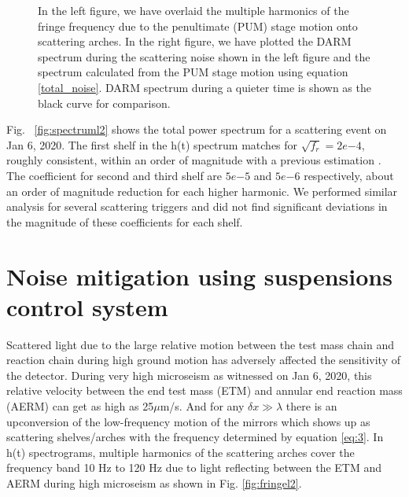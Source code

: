\documentclass[12pt]{iopart}
\begin{document}
\begin{figure}[h]
\begin{subfigure}[b]{0.45\textwidth}
    
    \end{subfigure}
    \caption{In the left figure, we have overlaid the multiple harmonics of the fringe frequency due to the penultimate (PUM) stage motion onto scattering arches. In the right figure, we have plotted the DARM spectrum during the scattering noise shown in the left figure and the spectrum calculated from the PUM stage motion using equation \ref{total_noise}. DARM spectrum during a quieter time is shown as the black curve for comparison.}
    \label{fig:fringespectrum}
    
\end{figure}


Fig. ~\ref{fig:spectruml2} shows the total power spectrum for a scattering event on Jan 6, 2020. The first shelf in the h(t) spectrum matches for $\sqrt{f_{r}} = 2e{-4}$, roughly consistent, within an order of magnitude with a previous estimation \cite{hiro_calc}. The coefficient for second and third shelf are $5e{-5}$ and $5e{-6}$ respectively, about an order of magnitude reduction for each higher harmonic. We performed similar analysis for several scattering triggers and did not find significant deviations in the magnitude of these coefficients for each shelf.
\qquad



\section{Noise mitigation using suspensions control system} \label{rzero}

Scattered light due to the large relative motion between the test mass chain and reaction chain during high ground motion has adversely affected the sensitivity of the detector. 
During very high microseism as witnessed on Jan 6, 2020, this relative velocity between the end test mass (ETM) and annular end reaction mass (AERM) can get as high as 25${\mu}$m/s. And for any ${\delta}x \gg {\lambda}$ there is an upconversion of the low-frequency motion of the mirrors which shows up as scattering shelves/arches with the frequency determined by equation \ref{eq:3}. In h(t) spectrograms, multiple harmonics of the scattering arches cover the frequency band 10 Hz to 120 Hz due to light reflecting between the ETM and AERM during high microseism as shown in Fig. \ref{fig:fringel2}.
\end{document}
